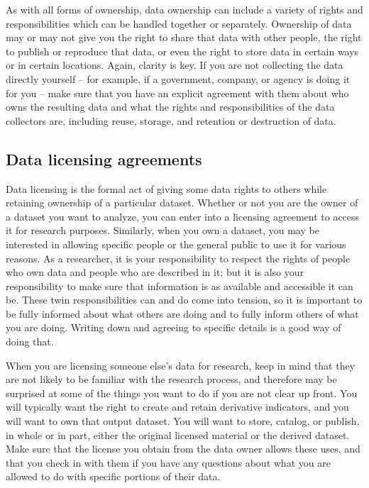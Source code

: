 As with all forms of ownership,
data ownership can include a variety of rights and responsibilities
which can be handled together or separately.
Ownership of data may or may not give you
the right to share that data with other people,
the right to publish or reproduce that data,
or even the right to store data in certain ways or in certain locations.
Again, clarity is key.
If you are not collecting the data directly yourself --
for example, if a government, company, or agency is doing it for you --
make sure that you have an explicit agreement with them
about who owns the resulting data
and what the rights and responsibilities of the data collectors are,
including reuse, storage, and retention or destruction of data.

\subsection{Data licensing agreements}

Data licensing is the formal act of giving some data rights to others
while retaining ownership of a particular dataset.
Whether or not you are the owner of a dataset you want to analyze,
you can enter into a licensing agreement to access it for research purposes.
Similarly, when you own a dataset,
you may be interested in allowing specific people
or the general public to use it for various reasons.
As a researcher, it is your responsibility to respect the rights
of people who own data and people who are described in it;
but it is also your responsibility to make sure
that information is as available and accessible it can be.
These twin responsibilities can and do come into tension,
so it is important to be fully informed about what others are doing
and to fully inform others of what you are doing.
Writing down and agreeing to specific details is a good way of doing that.

When you are licensing someone else's data for research,
keep in mind that they are not likely to be familiar
with the research process, and therefore may be surprised
at some of the things you want to do if you are not clear up front.
You will typically want the right to create and retain
derivative indicators, and you will want to own that output dataset.
You will want to store, catalog, or publish, in whole or in part,
either the original licensed material or the derived dataset.
Make sure that the license you obtain from the data owner allows these uses,
and that you check in with them if you have any questions
about what you are allowed to do with specific portions of their data.

